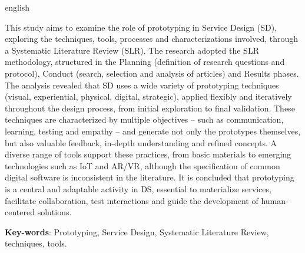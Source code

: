 \begin{resumo}[Abstract]
 \begin{otherlanguage*}{english}
 	
This study aims to examine the role of prototyping in Service Design (SD), exploring the techniques, tools, processes and characterizations involved, through a Systematic Literature Review (SLR). The research adopted the SLR methodology, structured in the Planning (definition of research questions and protocol), Conduct (search, selection and analysis of articles) and Results phases. The analysis revealed that SD uses a wide variety of prototyping techniques (visual, experiential, physical, digital, strategic), applied flexibly and iteratively throughout the design process, from initial exploration to final validation. These techniques are characterized by multiple objectives – such as communication, learning, testing and empathy – and generate not only the prototypes themselves, but also valuable feedback, in-depth understanding and refined concepts. A diverse range of tools support these practices, from basic materials to emerging technologies such as IoT and AR/VR, although the specification of common digital software is inconsistent in the literature. It is concluded that prototyping is a central and adaptable activity in DS, essential to materialize services, facilitate collaboration, test interactions and guide the development of human-centered solutions.

   \vspace{\onelineskip}
 
   \noindent 
   \textbf{Key-words}: Prototyping, Service Design, Systematic Literature Review, techniques, tools.
 \end{otherlanguage*}
\end{resumo}
